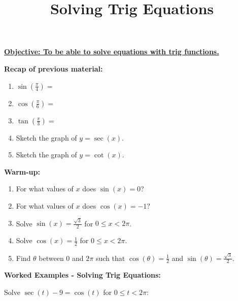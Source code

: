 \documentclass{article}
\begin{document}
\title{Solving Trig Equations}
\date{}

\maketitle

\Large

{\bf \underline{Objective: To be able to solve equations with trig functions.}}

\vspace{5mm}



{\bf Recap of previous material:}

\vspace{5mm}

\begin{enumerate}
\item $\sin\left(\frac{\pi}{4}\right)=$
\item $\cos\left(\frac{\pi}{6}\right)=$
\item $\tan\left(\frac{\pi}{3}\right)=$
\item Sketch the graph of $y=\sec(x)$.
\item Sketch the graph of $y=\cot(x)$.
\end{enumerate}


\clearpage






{\bf Warm-up:}

\vspace{5mm}

\begin{enumerate}
\item For what values of $x$ does $\sin(x)=0$?
\item For what values of $x$ does $\cos(x)=-1$?
\item Solve $\sin(x)=\frac{\sqrt{3}}{2}$ for $0\leq x<2\pi$.
\item Solve $\cos(x)=\frac{1}{2}$ for $0\leq x<2\pi$.
\item Find $\theta$ between $0$ and $2\pi$ such that $\cos(\theta)=\frac{1}{2}$ and $\sin(\theta)=\frac{\sqrt{3}}{2}$.
\end{enumerate}

\clearpage


{\bf Worked Examples - Solving Trig Equations:}

\vspace{5mm}

Solve $\sec(t)-9=\cos(t)$ for $0\leq t<2\pi$:
\end{document}
